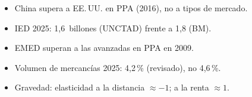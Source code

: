 \documentclass{article}
\begin{document}
\begin{columnas}
\begin{enumerate}
\end{enumerate}
\begin{trampa}
\begin{itemize}
\item China supera a EE.\,UU. en PPA (2016), no a tipos de mercado.
\item IED 2025: 1,6~billones (UNCTAD) frente a 1,8 (BM).
\item EMED superan a las avanzadas en PPA en 2009.
\item Volumen de mercancías 2025: 4,2\,\% (revisado), no 4,6\,\%.
\item Gravedad: elasticidad a la distancia $\approx-1$; a la renta $\approx1$.
\end{itemize}
\end{trampa}

\end{columnas}
\end{document}
